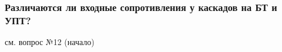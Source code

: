 \subsubsection{Различаются ли входные сопротивления у каскадов на БТ и УПТ?}

см. вопрос №12 (начало)
